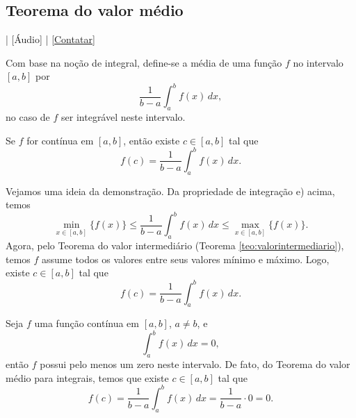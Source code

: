 \subsection{Teorema do valor médio}

\begin{flushright}
  [Vídeo] | [Áudio] | \href{https://phkonzen.github.io/notas/contato.html}{[Contatar]}
\end{flushright}

Com base na noção de integral, define-se a média de uma função $f$ no intervalo $[a, b]$ por
\begin{equation}
  \frac{1}{b-a}\int_a^b f(x)\,dx,
\end{equation}
no caso de $f$ ser integrável neste intervalo.

\begin{teo}\label{teo:int_teomed}
  Se $f$ for contínua em $[a, b]$, então existe $c\in [a, b]$ tal que
  \begin{equation}
    f(c) = \frac{1}{b-a}\int_a^b f(x)\,dx.
  \end{equation}
\end{teo}
\begin{dem}
  Vejamos uma ideia da demonstração. Da propriedade de integração e) acima, temos
  \begin{equation}
    \min_{x\in [a, b]} \{f(x)\} \leq \frac{1}{b-a}\int_a^b f(x)\,dx \leq \max_{x\in [a, b]} \{f(x)\}.
  \end{equation}
  Agora, pelo Teorema do valor intermediário (Teorema \ref{teo:valorintermediario}), temos $f$ assume todos os valores entre seus valores mínimo e máximo. Logo, existe $c\in [a, b]$ tal que
  \begin{equation}
    f(c) = \frac{1}{b-a}\int_a^b f(x)\,dx.
  \end{equation}  
\end{dem}

\begin{ex}
  Seja $f$ uma função contínua em $[a, b]$, $a\neq b$, e
  \begin{equation}
    \int_a^b f(x)\,dx = 0,
  \end{equation}
  então $f$ possui pelo menos um zero neste intervalo. De fato, do Teorema do valor médio para integrais, temos que existe $c\in [a, b]$ tal que
  \begin{equation}
    f(c) = \frac{1}{b-a}\int_a^b f(x)\,dx = \frac{1}{b-a}\cdot 0 = 0.
  \end{equation}
\end{ex}

